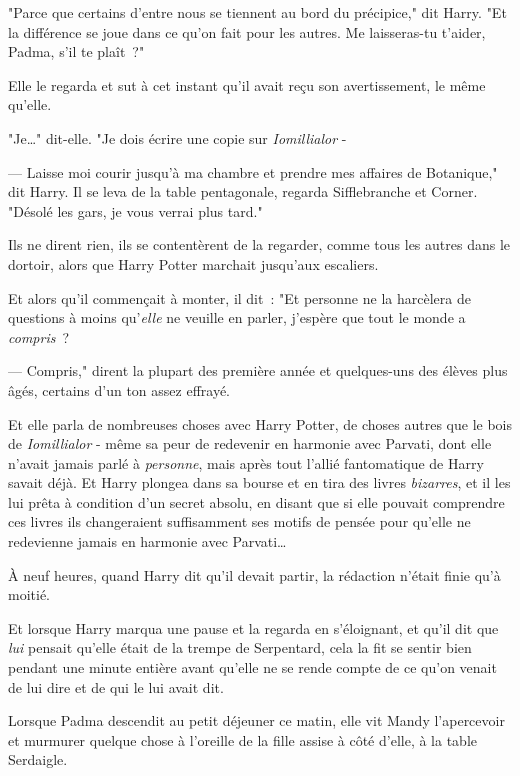"Parce que certains d'entre nous se tiennent au bord du précipice," dit Harry. "Et la différence se joue dans ce qu'on fait pour les autres. Me laisseras-tu t'aider, Padma, s'il te plaît~?"

Elle le regarda et sut à cet instant qu'il avait reçu son avertissement, le même qu'elle.

"Je…" dit-elle. "Je dois écrire une copie sur \emph{Iomillialor} -

--- Laisse moi courir jusqu'à ma chambre et prendre mes affaires de Botanique," dit Harry. Il se leva de la table pentagonale, regarda Sifflebranche et Corner. "Désolé les gars, je vous verrai plus tard."

Ils ne dirent rien, ils se contentèrent de la regarder, comme tous les autres dans le dortoir, alors que Harry Potter marchait jusqu'aux escaliers.

Et alors qu'il commençait à monter, il dit~: "Et personne ne la harcèlera de questions à moins qu'\emph{elle} ne veuille en parler, j'espère que tout le monde a \emph{compris}~?

--- Compris," dirent la plupart des première année et quelques-uns des élèves plus âgés, certains d'un ton assez effrayé.

\later

Et elle parla de nombreuses choses avec Harry Potter, de choses autres que le bois de \emph{Iomillialor} - même sa peur de redevenir en harmonie avec Parvati, dont elle n'avait jamais parlé à \emph{personne}, mais après tout l'allié fantomatique de Harry savait déjà. Et Harry plongea dans sa bourse et en tira des livres \emph{bizarres}, et il les lui prêta à condition d'un secret absolu, en disant que si elle pouvait comprendre ces livres ils changeraient suffisamment ses motifs de pensée pour qu'elle ne redevienne jamais en harmonie avec Parvati…

À neuf heures, quand Harry dit qu'il devait partir, la rédaction n'était finie qu'à moitié.

Et lorsque Harry marqua une pause et la regarda en s'éloignant, et qu'il dit que \emph{lui} pensait qu'elle était de la trempe de Serpentard, cela la fit se sentir bien pendant une minute entière avant qu'elle ne se rende compte de ce qu'on venait de lui dire et de qui le lui avait dit.

\later

Lorsque Padma descendit au petit déjeuner ce matin, elle vit Mandy l'apercevoir et murmurer quelque chose à l'oreille de la fille assise à côté d'elle, à la table Serdaigle.

